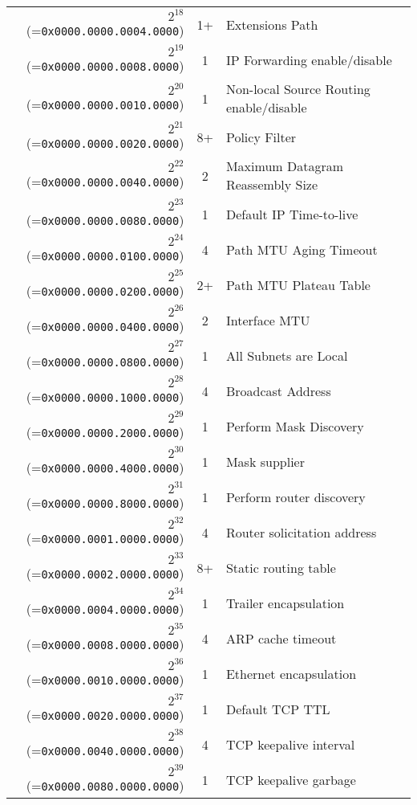\documentclass[documentation]{subfiles}
\begin{document}
\begin{small}
\begin{longtable}{rcl}
        $2^{18}$ (={\tt 0x0000.0000.0004.0000}) & 1+    & Extensions Path \\
        $2^{19}$ (={\tt 0x0000.0000.0008.0000}) & 1     & IP Forwarding enable/disable \\
        $2^{20}$ (={\tt 0x0000.0000.0010.0000}) & 1     & Non-local Source Routing enable/disable \\
        $2^{21}$ (={\tt 0x0000.0000.0020.0000}) & 8+    & Policy Filter \\
        $2^{22}$ (={\tt 0x0000.0000.0040.0000}) & 2     & Maximum Datagram Reassembly Size \\
        $2^{23}$ (={\tt 0x0000.0000.0080.0000}) & 1     & Default IP Time-to-live \\
        $2^{24}$ (={\tt 0x0000.0000.0100.0000}) & 4     & Path MTU Aging Timeout \\
        $2^{25}$ (={\tt 0x0000.0000.0200.0000}) & 2+    & Path MTU Plateau Table \\
        $2^{26}$ (={\tt 0x0000.0000.0400.0000}) & 2     & Interface MTU \\
        $2^{27}$ (={\tt 0x0000.0000.0800.0000}) & 1     & All Subnets are Local \\
        $2^{28}$ (={\tt 0x0000.0000.1000.0000}) & 4     & Broadcast Address \\
        $2^{29}$ (={\tt 0x0000.0000.2000.0000}) & 1     & Perform Mask Discovery \\
        $2^{30}$ (={\tt 0x0000.0000.4000.0000}) & 1     & Mask supplier \\
        $2^{31}$ (={\tt 0x0000.0000.8000.0000}) & 1     & Perform router discovery \\
        $2^{32}$ (={\tt 0x0000.0001.0000.0000}) & 4     & Router solicitation address \\
        $2^{33}$ (={\tt 0x0000.0002.0000.0000}) & 8+    & Static routing table \\
        $2^{34}$ (={\tt 0x0000.0004.0000.0000}) & 1     & Trailer encapsulation \\
        $2^{35}$ (={\tt 0x0000.0008.0000.0000}) & 4     & ARP cache timeout \\
        $2^{36}$ (={\tt 0x0000.0010.0000.0000}) & 1     & Ethernet encapsulation \\
        $2^{37}$ (={\tt 0x0000.0020.0000.0000}) & 1     & Default TCP TTL \\
        $2^{38}$ (={\tt 0x0000.0040.0000.0000}) & 4     & TCP keepalive interval \\
        $2^{39}$ (={\tt 0x0000.0080.0000.0000}) & 1     & TCP keepalive garbage \\

\end{longtable}
\end{small}
\end{document}
